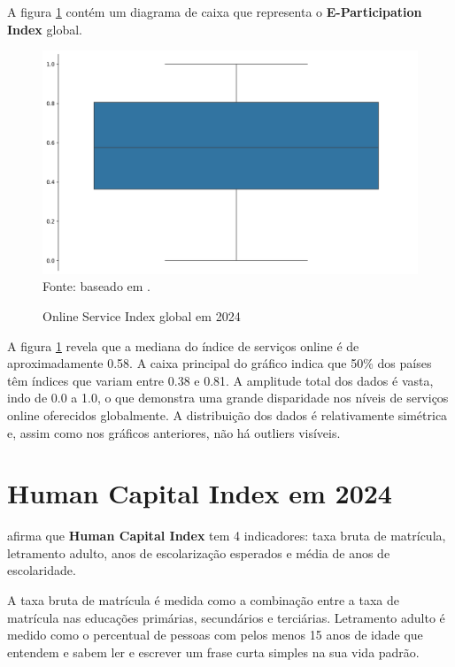 A figura \ref{fig:boxplot_osi_global} contém um diagrama de caixa que representa o \textbf{E-Participation Index} global.

\begin{figure}[H]
	\centering
	\caption{Online Service Index global em 2024}
	\includegraphics[width=1\linewidth]{figuras/egdi/boxplot_osi_global.png}
	\label{fig:boxplot_osi_global}
	\footnotesize{Fonte: baseado em \cite{ONU_EGDI_mapa}.}
\end{figure}

A figura \ref{fig:boxplot_osi_global} revela que a mediana do índice de serviços online é de aproximadamente 0.58. A caixa principal do gráfico indica que 50\% dos países têm índices que variam entre 0.38 e 0.81. A amplitude total dos dados é vasta, indo de 0.0 a 1.0, o que demonstra uma grande disparidade nos níveis de serviços online oferecidos globalmente. A distribuição dos dados é relativamente simétrica e, assim como nos gráficos anteriores, não há outliers visíveis.

\section{Human Capital Index em 2024}
\label{hci}

\cite{ONU_EGDI_methodology} afirma que \textbf{Human Capital Index} tem 4 indicadores: taxa bruta de matrícula, letramento adulto, anos de escolarização esperados e média de anos de escolaridade. 

A taxa bruta de matrícula é medida como a combinação entre a taxa de matrícula nas educações primárias, secundários e terciárias. Letramento adulto é medido como o percentual de pessoas com pelos menos 15 anos de idade que entendem e sabem ler e escrever um frase curta simples na sua vida padrão.

